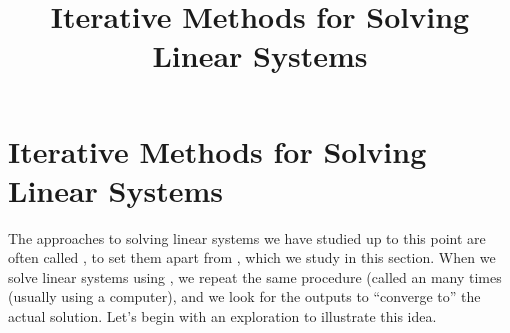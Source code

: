 \documentclass{ximera}
\title{Iterative Methods for Solving Linear Systems} \license{CC BY-NC-SA 4.0}
\begin{document}
\begin{abstract}

\end{abstract}
\maketitle
\section*{Iterative Methods for Solving Linear Systems}

The approaches to solving linear systems we have studied up to this point are often called , to set them apart from , which we study in this section.  When we solve linear systems using , we repeat the same procedure (called an  many times (usually using a computer), and we look for the outputs to ``converge to'' the actual solution.  Let's begin with an exploration to illustrate this idea.
\end{document}
